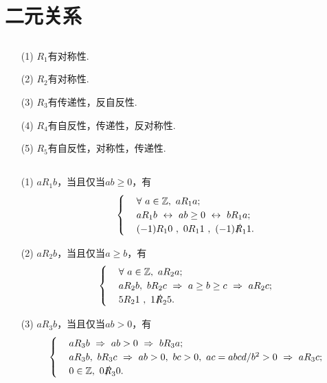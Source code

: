 \documentclass[UTF8]{ctexart}
\begin{document}
\fancyfoot[C]{\thepage}

\section{二元关系}
\subsection{}   %
\begin{enumerate}
    \item [(1)]$R_1$有对称性.
    \item [(2)]$R_2$有对称性.
    \item [(3)]$R_3$有传递性，反自反性.
    \item [(4)]$R_4$有自反性，传递性，反对称性.
    \item [(5)]$R_5$有自反性，对称性，传递性.
\end{enumerate}

\subsection{}   %
\begin{enumerate}
    \item [(1)]$a R_1 b$，当且仅当$ab \geq 0$，有
    \[
        \begin{cases}
            &\forall\ a\in \mathbb{Z},\ a R_1 a;\\
            &a R_1 b \ \leftrightarrow\ ab\geq 0 \ \leftrightarrow\ b R_1 a;\\
            &(-1) R_1 0\ ,\ 0 R_1 1\ ,\ (-1)\slashed{R}_1 1 .
        \end{cases}
    \]
    \item [(2)]$a R_2 b$，当且仅当$a \geq b$，有
    \[
        \begin{cases}
            &\forall\ a\in \mathbb{Z},\ a R_2 a;\\
            &a R_2 b,\ b R_2 c \ \Rightarrow\ a\geq b \geq c \ \Rightarrow\ a R_2 c;\\
            &5 R_2 1\ , \ 1\slashed{R}_2 5 .
        \end{cases}
    \]
    \item [(3)]$a R_3 b$，当且仅当$ab > 0$，有
    \[
        \begin{cases}
            &a R_3 b \ \Rightarrow\ ab>0 \ \Rightarrow\ b R_3 a;\\
            &a R_3 b,\ b R_3 c \ \Rightarrow\ ab>0,\ bc>0,\ ac=abcd/b^2>0 \ \Rightarrow\ a R_3 c;\\
            &0\in\mathbb{Z},\ 0 \slashed{R}_3 0.
        \end{cases}
    \]
\end{enumerate}
\end{document}
